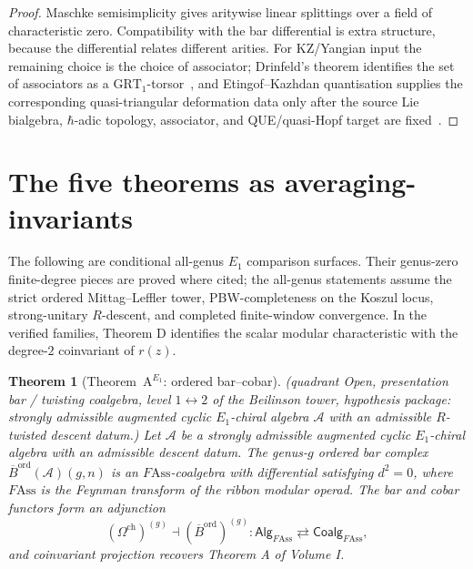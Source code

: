\documentclass[11pt,reqno]{amsart}
\newtheorem{theorem}{Theorem}[section]
\theoremstyle{definition}
\theoremstyle{remark}
\newcommand{\cA}{\mathcal{A}}
\newcommand{\Ass}{\mathrm{Ass}}
\newcommand{\Barord}{\overline{B}^{\mathrm{ord}}}
\newcommand{\Cobar}{\Omega^{\mathrm{ch}}}
\newcommand{\GRT}{\mathrm{GRT}}
\numberwithin{equation}{section}
\begin{document}
\begin{proof}
Maschke semisimplicity gives aritywise linear splittings over a
field of characteristic zero. Compatibility with the bar
differential is extra structure, because the differential relates
different arities. For KZ/Yangian input the remaining choice is the
choice of associator; Drinfeld's theorem identifies the set of
associators as a $\GRT_1$-torsor~\cite{Drinfeld90}, and
Etingof--Kazhdan quantisation supplies the corresponding
quasi-triangular deformation data only after the source Lie bialgebra,
\(\hbar\)-adic topology, associator, and QUE/quasi-Hopf target are
fixed~\cite{EtingofKazhdan96}.
\end{proof}

\section{The five theorems as averaging-invariants}
\label{sec:five-theorems}

The following are conditional all-genus $E_1$ comparison surfaces.
Their genus-zero finite-degree pieces are proved where cited; the
all-genus statements assume the strict ordered Mittag--Leffler
tower, PBW-completeness on the Koszul locus, strong-unitary
$R$-descent, and completed finite-window convergence. In the
verified families, Theorem D identifies the scalar modular
characteristic with the degree-$2$ coinvariant of $r(z)$.

\begin{theorem}[Theorem~$\mathrm{A}^{E_{1}}$: ordered bar--cobar]
\label{thm:e1-theorem-a}
\textup{(}\emph{quadrant} Open, \emph{presentation} bar / twisting
coalgebra, \emph{level} $1 \leftrightarrow 2$ of the Beilinson
tower, \emph{hypothesis package}: strongly admissible augmented
cyclic $E_{1}$-chiral algebra $\cA$ with an admissible $R$-twisted
descent datum.\textup{)}
Let $\cA$ be a strongly admissible augmented cyclic
$E_1$-chiral algebra with an admissible descent datum. The genus-$g$
ordered bar complex
$\Barord(\cA)(g,n)$ is an $F\Ass$-coalgebra with differential
satisfying $d^{2} = 0$, where $F\Ass$ is the Feynman transform
of the ribbon modular operad. The bar and cobar functors form an
adjunction
\[
(\Cobar)^{(g)} \dashv (\Barord)^{(g)}
\colon \mathsf{Alg}_{F\Ass} \rightleftarrows
\mathsf{Coalg}_{F\Ass},
\]
and coinvariant projection recovers Theorem A of Volume I.
\end{theorem}
\end{document}
